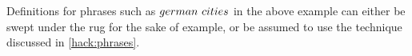 \documentclass[main.tex]{subfiles}
\begin{document}

Definitions for phrases such as $german \text{ } cities$ in the above example can
either be swept under the rug for the sake of example, or be assumed to use the
technique discussed in \cref{hack:phrases}.
\end{document}
